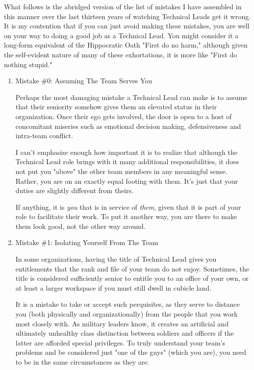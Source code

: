 \documentclass{article}
\begin{document}
What follows is the abridged version of the list of mistakes I have
assembled in this manner over the last thirteen years of watching
Technical Leads get it wrong. It is my contention that if you can just
avoid making these mistakes, you are well on your way to doing a good
job as a Technical Lead. You might consider it a long-form equivalent of
the Hippocratic Oath "First do no harm," although given the self-evident
nature of many of these exhortations, it is more like "First do nothing
stupid."

\begin{enumerate}
\item Mistake \#0: Assuming The Team Serves You
\label{sec:orgheadline143}

Perhaps the most damaging mistake a Technical Lead can make is to assume
that their seniority somehow gives them an elevated status in their
organization. Once their ego gets involved, the door is open to a host
of concomitant miseries such as emotional decision making, defensiveness
and intra-team conflict.

I can't emphasize enough how important it is to realize that although
the Technical Lead role brings with it many additional responsibilities,
it does not put you "above" the other team members in any meaningful
sense. Rather, you are on an exactly equal footing with them. It's just
that your duties are slightly different from theirs.

If anything, it is \emph{you} that is in service of \emph{them}, given that it is
part of your role to facilitate their work. To put it another way, you
are there to make them look good, not the other way around.

\item Mistake \#1: Isolating Yourself From The Team
\label{sec:orgheadline144}

In some organizations, having the title of Technical Lead gives you
entitlements that the rank and file of your team do not enjoy.
Sometimes, the title is considered sufficiently senior to entitle you to
an office of your own, or at least a larger workspace if you must still
dwell in cubicle land.

It is a mistake to take or accept such perquisites, as they serve to
distance you (both physically and organizationally) from the people that
you work most closely with. As military leaders know, it creates an
artificial and ultimately unhealthy class distinction between soldiers
and officers if the latter are afforded special privileges. To truly
understand your team's problems and be considered just "one of the guys"
(which you are), you need to be in the same circumstances as they are.


\end{enumerate}
\end{document}
